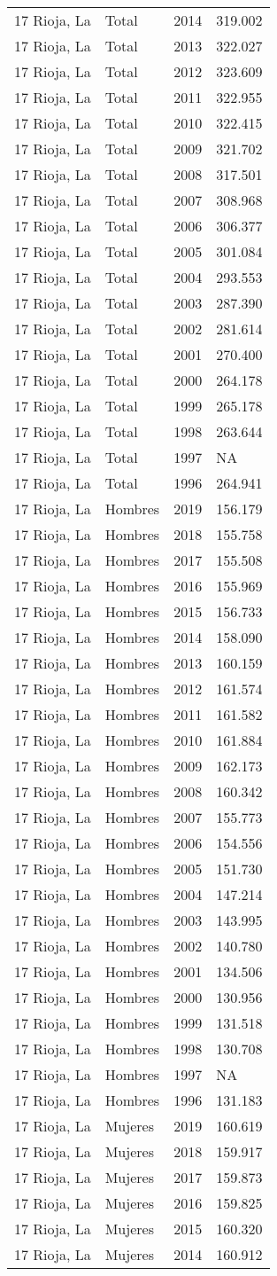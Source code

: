 \documentclass[
]{article}
\begin{document}
\begin{longtable}[]{@{}llrl@{}}
17 Rioja, La & Total & 2014 & 319.002\tabularnewline
17 Rioja, La & Total & 2013 & 322.027\tabularnewline
17 Rioja, La & Total & 2012 & 323.609\tabularnewline
17 Rioja, La & Total & 2011 & 322.955\tabularnewline
17 Rioja, La & Total & 2010 & 322.415\tabularnewline
17 Rioja, La & Total & 2009 & 321.702\tabularnewline
17 Rioja, La & Total & 2008 & 317.501\tabularnewline
17 Rioja, La & Total & 2007 & 308.968\tabularnewline
17 Rioja, La & Total & 2006 & 306.377\tabularnewline
17 Rioja, La & Total & 2005 & 301.084\tabularnewline
17 Rioja, La & Total & 2004 & 293.553\tabularnewline
17 Rioja, La & Total & 2003 & 287.390\tabularnewline
17 Rioja, La & Total & 2002 & 281.614\tabularnewline
17 Rioja, La & Total & 2001 & 270.400\tabularnewline
17 Rioja, La & Total & 2000 & 264.178\tabularnewline
17 Rioja, La & Total & 1999 & 265.178\tabularnewline
17 Rioja, La & Total & 1998 & 263.644\tabularnewline
17 Rioja, La & Total & 1997 & NA\tabularnewline
17 Rioja, La & Total & 1996 & 264.941\tabularnewline
17 Rioja, La & Hombres & 2019 & 156.179\tabularnewline
17 Rioja, La & Hombres & 2018 & 155.758\tabularnewline
17 Rioja, La & Hombres & 2017 & 155.508\tabularnewline
17 Rioja, La & Hombres & 2016 & 155.969\tabularnewline
17 Rioja, La & Hombres & 2015 & 156.733\tabularnewline
17 Rioja, La & Hombres & 2014 & 158.090\tabularnewline
17 Rioja, La & Hombres & 2013 & 160.159\tabularnewline
17 Rioja, La & Hombres & 2012 & 161.574\tabularnewline
17 Rioja, La & Hombres & 2011 & 161.582\tabularnewline
17 Rioja, La & Hombres & 2010 & 161.884\tabularnewline
17 Rioja, La & Hombres & 2009 & 162.173\tabularnewline
17 Rioja, La & Hombres & 2008 & 160.342\tabularnewline
17 Rioja, La & Hombres & 2007 & 155.773\tabularnewline
17 Rioja, La & Hombres & 2006 & 154.556\tabularnewline
17 Rioja, La & Hombres & 2005 & 151.730\tabularnewline
17 Rioja, La & Hombres & 2004 & 147.214\tabularnewline
17 Rioja, La & Hombres & 2003 & 143.995\tabularnewline
17 Rioja, La & Hombres & 2002 & 140.780\tabularnewline
17 Rioja, La & Hombres & 2001 & 134.506\tabularnewline
17 Rioja, La & Hombres & 2000 & 130.956\tabularnewline
17 Rioja, La & Hombres & 1999 & 131.518\tabularnewline
17 Rioja, La & Hombres & 1998 & 130.708\tabularnewline
17 Rioja, La & Hombres & 1997 & NA\tabularnewline
17 Rioja, La & Hombres & 1996 & 131.183\tabularnewline
17 Rioja, La & Mujeres & 2019 & 160.619\tabularnewline
17 Rioja, La & Mujeres & 2018 & 159.917\tabularnewline
17 Rioja, La & Mujeres & 2017 & 159.873\tabularnewline
17 Rioja, La & Mujeres & 2016 & 159.825\tabularnewline
17 Rioja, La & Mujeres & 2015 & 160.320\tabularnewline
17 Rioja, La & Mujeres & 2014 & 160.912\tabularnewline

\end{longtable}
\end{document}
